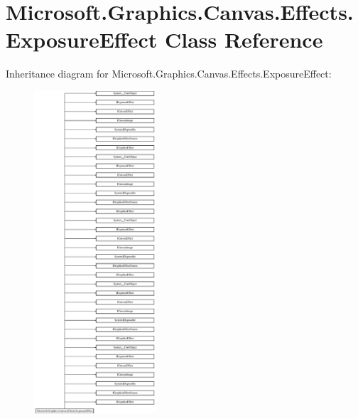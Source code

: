 \hypertarget{class_microsoft_1_1_graphics_1_1_canvas_1_1_effects_1_1_exposure_effect}{}\section{Microsoft.\+Graphics.\+Canvas.\+Effects.\+Exposure\+Effect Class Reference}
\label{class_microsoft_1_1_graphics_1_1_canvas_1_1_effects_1_1_exposure_effect}
Inheritance diagram for Microsoft.\+Graphics.\+Canvas.\+Effects.\+Exposure\+Effect\+:\begin{figure}[H]
\begin{center}
\leavevmode
\includegraphics[height=12.000000cm]{class_microsoft_1_1_graphics_1_1_canvas_1_1_effects_1_1_exposure_effect}
\end{center}
\end{figure}
